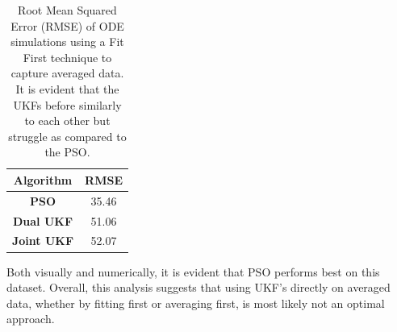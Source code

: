 \begin{table}[H]
  \begin{center}
    \begin{tabular}{c|c} %
      \textbf{Algorithm} & \textbf{RMSE} \\
      \hline
      \textbf{PSO} & 35.46\\
      \textbf{Dual UKF} & 51.06\\
      \textbf{Joint UKF} & 52.07
    \end{tabular}
    \caption{Root Mean Squared Error (RMSE) of ODE simulations using a Fit First technique to capture averaged data. It is evident that the UKFs before similarly to each other but struggle as compared to the PSO.}
    \label{table:Results_FitFirst_RMSE}
  \end{center}
\end{table}
Both visually and numerically, it is evident that PSO performs best on this dataset. Overall, this analysis suggests that using UKF's directly on averaged data, whether by fitting first or averaging first, is most likely not an optimal approach. 

